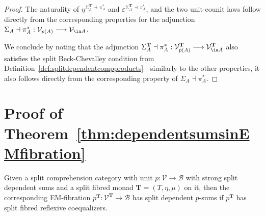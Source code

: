 \begin{proof}
The naturality of $\eta^{\Sigma^{\mathbf{T}}_A \,\dashv\, \pi^*_A}$ and $\varepsilon^{\Sigma^{\mathbf{T}}_A \,\dashv\, \pi^*_A}$, and the two unit-counit laws follow directly from the corresponding properties for the adjunction $\Sigma_A \dashv \pi^*_A : \mathcal{V}_{p(A)} \longrightarrow \mathcal{V}_{\ia A}$.

We conclude by noting that the adjunction $\Sigma^{\mathbf{T}}_A \dashv \pi^*_A : \mathcal{V}^{\mathbf{T}}_{p(A)} \longrightarrow \mathcal{V}^{\mathbf{T}}_{\ia A}$ also satisfies the split Beck-Chevalley condition from Definition~\ref{def:splitdependentcompproducts}---similarly to the other properties, it also follows directly from the corresponding property of $\Sigma_A \dashv \pi^*_A$.
\end{proof}


\section{Proof of Theorem~\ref{thm:dependentsumsinEMfibration}}
\label{sect:proofofthm:dependentsumsinEMfibration}

{
\renewcommand{\thetheorem}{\ref{thm:dependentsumsinEMfibration}}
\begin{theorem}
Given a split comprehension category with unit $p : \mathcal{V} \longrightarrow \mathcal{B}$ with strong split dependent sums and a split fibred monad $\mathbf{T} = (T,\eta,\mu)$ on it, then the corresponding EM-fibration $p^{\mathbf{T}} : \mathcal{V}^{\mathbf{T}} \longrightarrow \mathcal{B}$ has split dependent $p$-sums if $p^{\mathbf{T}}$ has split fibred reflexive coequalizers.
\end{theorem}
\addtocounter{theorem}{-1}
}

